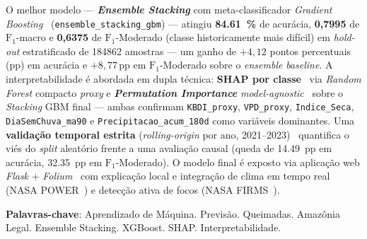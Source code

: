 \begin{resumo}
O melhor modelo --- \textbf{\emph{Ensemble Stacking}} com meta-classificador \emph{Gradient Boosting}~\cite{friedman2001greedy} (\texttt{ensemble\_stacking\_gbm}) --- atingiu \textbf{\SI{84,61}{\percent}} de acurácia, \textbf{0,7995} de \(\text{F}_1\)-macro e \textbf{0,6375} de \(\text{F}_1\)-Moderado (classe historicamente mais difícil) em \emph{hold-out} estratificado de \num{184862} amostras --- um ganho de \(+4,12\) pontos percentuais (pp) em acurácia e \(+8,77\,\text{pp}\) em \(\text{F}_1\)-Moderado sobre o \emph{ensemble} \emph{baseline}. A interpretabilidade é abordada em dupla técnica: \textbf{SHAP por classe}~\cite{lundberg2017unified,lundberg2020local} via \emph{Random Forest} compacto \emph{proxy} e \textbf{\emph{Permutation Importance}} \emph{model-agnostic}~\cite{breiman2001random,fisher2019all} sobre o \emph{Stacking} GBM final --- ambas confirmam \texttt{KBDI\_proxy}, \texttt{VPD\_proxy}, \texttt{Indice\_Seca}, \texttt{DiaSemChuva\_ma90} e \texttt{Precipitacao\_acum\_180d} como variáveis dominantes. Uma \textbf{validação temporal estrita} (\emph{rolling-origin} por ano, 2021--2023)~\cite{bergmeir2012cv} quantifica o viés do \emph{split} aleatório frente a uma avaliação causal (queda de \SI{14,49}{pp} em acurácia, \SI{32,35}{pp} em \(\text{F}_1\)-Moderado). O modelo final é exposto via aplicação web \emph{Flask} + \emph{Folium}~\cite{folium,leafletjs} com explicação local e integração de clima em tempo real (NASA POWER~\cite{nasapower}) e detecção ativa de focos (NASA FIRMS~\cite{nasafirms}).

\textbf{Palavras-chave}: Aprendizado de Máquina. Previsão. Queimadas. Amazônia Legal. Ensemble Stacking. XGBoost. SHAP. Interpretabilidade.
\end{resumo}


